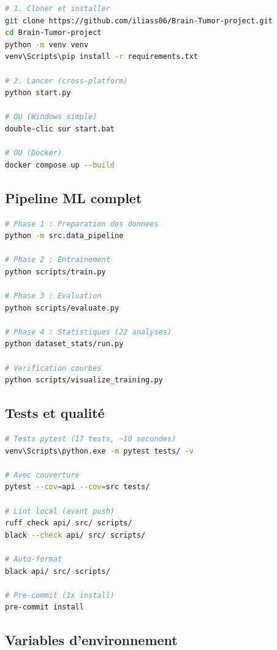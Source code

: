 \documentclass[11pt,a4paper,oneside]{report}
\begin{document}
\begin{lstlisting}[language=Bash, caption={Premier lancement}]
# 1. Cloner et installer
git clone https://github.com/iliass06/Brain-Tumor-project.git
cd Brain-Tumor-project
python -m venv venv
venv\Scripts\pip install -r requirements.txt

# 2. Lancer (cross-platform)
python start.py

# OU (Windows simple)
double-clic sur start.bat

# OU (Docker)
docker compose up --build
\end{lstlisting}

\subsection{Pipeline ML complet}

\begin{lstlisting}[language=Bash, caption={Pipeline projet de bout en bout}]
# Phase 1 : Preparation des donnees
python -m src.data_pipeline

# Phase 2 : Entrainement
python scripts/train.py

# Phase 3 : Evaluation
python scripts/evaluate.py

# Phase 4 : Statistiques (22 analyses)
python dataset_stats/run.py

# Verification courbes
python scripts/visualize_training.py
\end{lstlisting}

\subsection{Tests et qualité}

\begin{lstlisting}[language=Bash, caption={Tests et lint}]
# Tests pytest (17 tests, ~10 secondes)
venv\Scripts\python.exe -m pytest tests/ -v

# Avec couverture
pytest --cov=api --cov=src tests/

# Lint local (avant push)
ruff check api/ src/ scripts/
black --check api/ src/ scripts/

# Auto-format
black api/ src/ scripts/

# Pre-commit (1x install)
pre-commit install
\end{lstlisting}

\subsection{Variables d'environnement}
\end{document}
